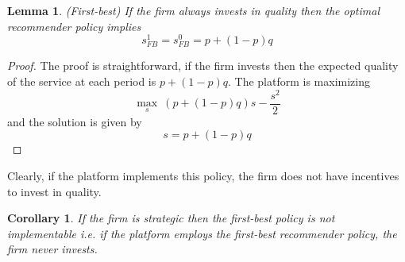 \documentclass[a4paper]{article}
\newtheorem{corollary}{Corollary}[theorem]
\newtheorem{lemma}[theorem]{Lemma}
\begin{document}
\begin{lemma}(First-best)
	If the firm always invests in quality then the optimal recommender policy implies $$s^1_{FB} = s^0_{FB} = p + (1-p)q$$
\end{lemma}
\begin{proof}
	The proof is straightforward, if the firm invests then the expected quality of the service at each period is $p+(1-p)q$. The platform is maximizing $$\underset{s}{\max}\ (p+(1-p)q)s - \frac{s^2}{2}$$ and the solution is given by $$s = p + (1-p)q$$
\end{proof}
Clearly, if the platform implements this policy, the firm does not have incentives to invest in quality. 
\begin{corollary}
	If the firm is strategic then the first-best policy is not implementable i.e. if the platform employs the first-best recommender policy, the firm never invests.
\end{corollary}
\end{document}
